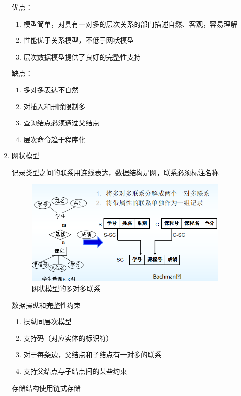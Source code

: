 \documentclass{article}
\begin{document}
\begin{enumerate}
    优点：

    \begin{enumerate}
        \item 模型简单，对具有一对多的层次关系的部门描述自然、客观，容易理解
        \item 性能优于关系模型，不低于网状模型
        \item 层次数据模型提供了良好的完整性支持
    \end{enumerate}

    缺点：

    \begin{enumerate}
        \item 多对多表达不自然
        \item 对插入和删除限制多
        \item 查询结点必须通过父结点
        \item 层次命令趋于程序化
    \end{enumerate}

    \item 网状模型

    记录类型之间的联系用连线表达，数据结构是网，联系必须标注名称

    \begin{figure}
        \centering
        \includegraphics[width=10cm]{img/1.2-11.png}
        \caption{网状模型的多对多联系}
    \end{figure}

    数据操纵和完整性约束
    \begin{enumerate}
        \item 操纵同层次模型
        \item 支持码（对应实体的标识符）
        \item 对于每条边，父结点和子结点有一对多的联系
        \item 支持父结点与子结点间的某些约束
    \end{enumerate}

    存储结构使用链式存储


\end{enumerate}
\end{document}
